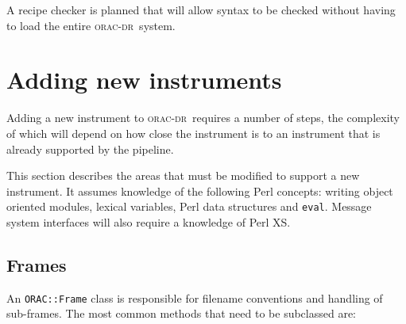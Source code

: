 \documentclass[twoside,11pt]{article}
\renewcommand{\_}{\texttt{\symbol{95}}}
\newcommand{\Oracdr}{\textsc{orac-dr}}
\begin{document}
A recipe checker is planned that will allow syntax to be checked
without having to load the entire \Oracdr\ system.

\section{Adding new instruments}

Adding a new instrument to \Oracdr\ requires a number of steps, the
complexity of which will depend on how close the instrument is to an
instrument that is already supported by the pipeline.

This section describes the areas that must be modified to support a
new instrument. It assumes knowledge of the following Perl concepts:
writing object oriented modules, lexical variables, Perl data
structures and \texttt{eval}. Message system interfaces will also
require a knowledge of Perl XS.


\subsection{Frames}

An \texttt{ORAC::Frame} class is responsible for filename conventions
and handling of sub-frames. The most common methods that need to be
subclassed are:
\end{document}
